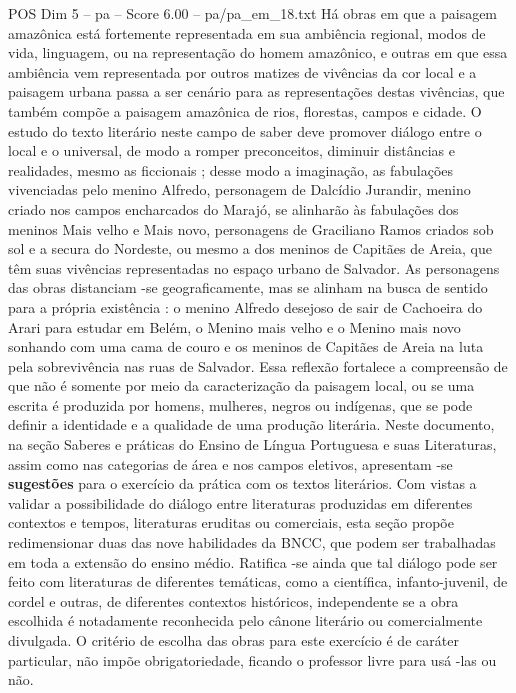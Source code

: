 \begin{textsample}{POS Dim 5 – pa – Score 6.00 – pa/pa\_em\_18.txt}
Há obras em que a paisagem amazônica está fortemente representada em sua ambiência regional, modos de vida, linguagem, ou na representação do homem amazônico, e outras em que essa ambiência vem representada por outros matizes de vivências da cor local e a paisagem urbana passa a ser cenário para as representações destas vivências, que também compõe a paisagem amazônica de rios, florestas, campos e cidade.
O estudo do texto literário neste campo de saber deve promover diálogo entre o local e o universal, de modo a romper preconceitos, diminuir distâncias e realidades, mesmo as ficcionais ; desse modo a imaginação, as fabulações vivenciadas pelo menino Alfredo, personagem de Dalcídio Jurandir, menino criado nos campos encharcados do Marajó, se alinharão às fabulações dos meninos Mais velho e Mais novo, personagens de Graciliano Ramos criados sob sol e a secura do Nordeste, ou mesmo a dos meninos de Capitães de Areia, que têm suas vivências representadas no espaço urbano de Salvador.
As personagens das obras distanciam -se geograficamente, mas se alinham na busca de sentido para a própria existência : o menino Alfredo desejoso de sair de Cachoeira do Arari para estudar em Belém, o Menino mais velho e o Menino mais novo sonhando com uma cama de couro e os meninos de Capitães de Areia na luta pela sobrevivência nas ruas de Salvador.
Essa reflexão fortalece a compreensão de que não é somente por meio da caracterização da paisagem local, ou se uma escrita é produzida por homens, mulheres, negros ou indígenas, que se pode definir a identidade e a qualidade de uma produção literária.
Neste documento, na seção Saberes e práticas do Ensino de Língua Portuguesa e suas Literaturas, assim como nas categorias de área e nos campos eletivos, apresentam -se \textbf{sugestões} para o exercício da prática com os textos literários.
Com vistas a validar a possibilidade do diálogo entre literaturas produzidas em diferentes contextos e tempos, literaturas eruditas ou comerciais, esta seção propõe redimensionar duas das nove habilidades da BNCC, que podem ser trabalhadas em toda a extensão do ensino médio.
Ratifica -se ainda que tal diálogo pode ser feito com literaturas de diferentes temáticas, como a científica, infanto-juvenil, de cordel e outras, de diferentes contextos históricos, independente se a obra escolhida é notadamente reconhecida pelo cânone literário ou comercialmente divulgada.
O critério de escolha das obras para este exercício é de caráter particular, não impõe obrigatoriedade, ficando o professor livre para usá -las ou não.

\end{textsample}
